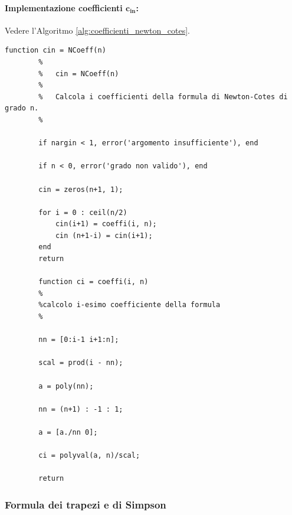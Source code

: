 \paragraph{Implementazione coefficienti $\boldsymbol{c_{in}}$:} Vedere l'Algoritmo \ref{alg:coefficienti_newton_cotes}.

\begin{algorithm}
	\caption{Implementazione coefficienti Newton-Cotes.}\label{alg:coefficienti_newton_cotes}
	\begin{lstlisting}[style=Matlab-editor]
		function cin = NCoeff(n)
		%   
		%   cin = NCoeff(n)
		%
		%   Calcola i coefficienti della formula di Newton-Cotes di grado n.
		%
		
		if nargin < 1, error('argomento insufficiente'), end
		
		if n < 0, error('grado non valido'), end
		
		cin = zeros(n+1, 1);
		
		for i = 0 : ceil(n/2)
			cin(i+1) = coeffi(i, n);
			cin (n+1-i) = cin(i+1);
		end
		return
		
		function ci = coeffi(i, n)
		%
		%calcolo i-esimo coefficiente della formula
		%
		
		nn = [0:i-1 i+1:n];
		
		scal = prod(i - nn);
		
		a = poly(nn);
		
		nn = (n+1) : -1 : 1;
		
		a = [a./nn 0];
		
		ci = polyval(a, n)/scal;
		
		return
	\end{lstlisting}
\end{algorithm}

\subsubsection{Formula dei trapezi e di Simpson}

